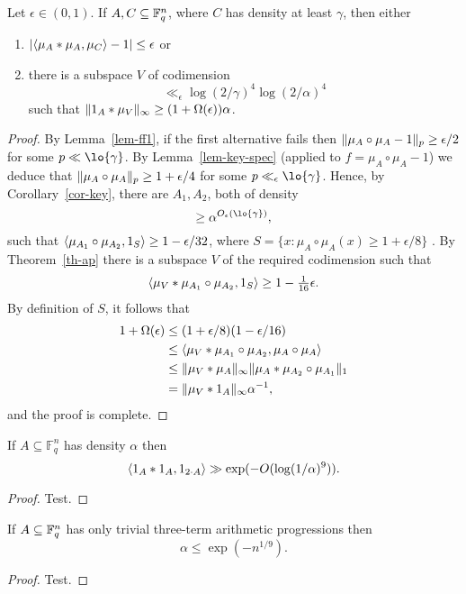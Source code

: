 \begin{proposition}\label{di_in_ff}
Let $\epsilon \in (0,1)$. If $A,C\subseteq \mathbb{F}_q^n$, where $C$ has density at least $\gamma$, then either
\begin{enumerate}
\item $\left\lvert \langle \mu_A\ast \mu_A,\mu_C\rangle -1\right\rvert\leq \epsilon$ or
\item there is a subspace $V$ of codimension
\[\ll_\epsilon \log(2/\gamma)^4\log(2/\alpha)^4\]
such that $\lVert 1_{A}\ast \mu_V\rVert_\infty \geq (1+\Omega(\epsilon))\alpha$.
\end{enumerate}
\end{proposition}
\begin{proof}
By Lemma~\ref{lem-ff1}, if the first alternative fails then $\lVert \mu_A\circ \mu_A-1\rVert_p\geq \epsilon/2$ for some $p\ll \lo{\gamma}$. By Lemma~\ref{lem-key-spec} (applied to $f=\mu_A\circ \mu_A-1$) we deduce that $\lVert \mu_A\circ \mu_A\rVert_p\geq 1+\epsilon/4$ for some $p\ll_\epsilon \lo{\gamma}$. Hence, by Corollary~\ref{cor-key}, there are $A_1,A_2$, both of density
\[\geq \alpha^{O_\epsilon(\lo{\gamma})},\]
such that $\langle \mu_{A_1}\circ \mu_{A_2},1_{S}\rangle \geq 1-\epsilon/32$, where $S=\{x : \mu_A\circ \mu_A(x)\geq 1+\epsilon/8\}$ . By Theorem~\ref{th-ap} there is a subspace $V$ of the required codimension such that
\[\langle \mu_V\ast \mu_{A_1}\circ \mu_{A_2},1_{S}\rangle \geq 1-\tfrac{1}{16}\epsilon.\]
By definition of $S$, it follows that
\begin{align*}
1+\Omega(\epsilon)
&\leq (1+\epsilon/8)(1-\epsilon/16)\\
&\leq \langle \mu_V\ast \mu_{A_1}\circ \mu_{A_2},\mu_A\circ \mu_A\rangle\\
&\leq \lVert \mu_V\ast \mu_A\rVert_\infty \lVert \mu_{A}\ast \mu_{A_2}\circ \mu_{A_1}\rVert_1\\
&= \lVert \mu_V\ast 1_{A}\rVert_\infty \alpha^{-1},
\end{align*}
and the proof is complete.
\end{proof}

\begin{theorem}\label{3aps_in_ff_count}
If $A\subseteq \mathbb{F}_q^n$ has density $\alpha$ then
\[\langle 1_{A}\ast 1_{A},1_{2\cdot A}\rangle \gg \exp(-O(\log(1/\alpha)^9)).\]
\end{theorem}
\begin{proof}
Test.
\end{proof}

\begin{theorem}\label{3aps_in_ff}
If $A\subseteq \mathbb{F}_q^n$ has only trivial three-term arithmetic progressions then
\[\alpha \leq \exp(-n^{1/9}).\]
\end{theorem}
\begin{proof}
Test.
\end{proof}

